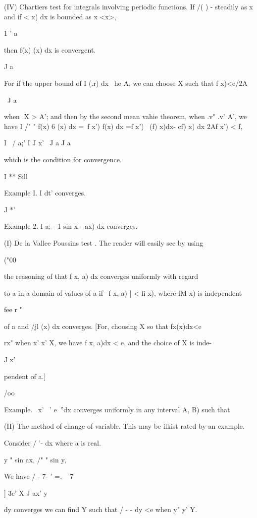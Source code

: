 (IV) Chartiers test for integrals involving periodic functions. If /(
) - steadily as x and if < x) dx is bounded as x <x>,

1 ' a

then f(x) (x) dx is convergent.

J a

For if the upper bound of I (.r) dx \ he A, we can choose X such that
f x)<e/2A

\ J a

when .X > A'; and then by the second mean vahie theorem, when .v" .v'
A', we have I /" " f(x) 6 (x) dx =\ f x') f(x) dx =f x') \ (f) x)dx-
cf) x) dx 2Af x') < f,

I \ / a;'  I J x' \ J a J a

which is the condition for convergence.

I ** Sill

Example I. I dt' converges.

J *'

Example 2. I a; - 1 sin x - ax) dx converges.


(I) De la Vallee Poussins test . The reader will easily see by using

("00

the reasoning of that f x, a) dx converges uniformly with
regard

to a in a domain of values of a if \ f x, a) | < fi x), where fM x) is
independent

fee r "

of a and /jl (x) dx converges. [For, choosing X so that fx(x)dx<e

rx" when x' x' X, we have f x, a)dx < e, and the choice of X is inde-

J x'

pendent of a.]

/oo

Example. \ x' ~' e~''dx converges uniformly in any interval A, B) such
that

(II) The method of change of variable. This may be ilkist rated by an
example.

Consider / '- dx where a is real.

y " sin ax, /" " sin y,

We have / - 7- ' =, ~ 7~ 

] 3c' X J ax' y

   dy converges we can find Y such that / - - dy <e when y" y' Y.


